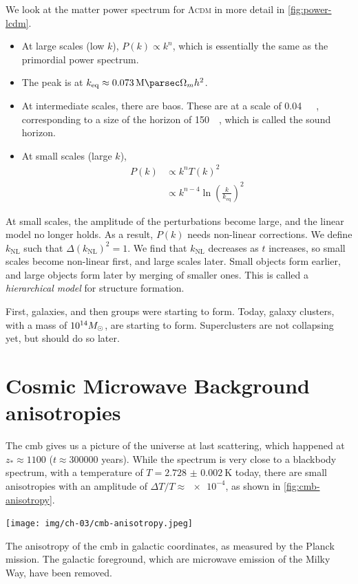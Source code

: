 We look at the matter power spectrum for \textsc{Λcdm} in more detail in \cref{fig:power-lcdm}. 
\begin{itemize}
	\item At large scales (low $k$), $P(k) \propto k^n$, which is essentially the same as the primordial power spectrum.
	\item The peak is at $k_\text{eq} \approx \SI{0.073}{\per\mega\parsec} \Omega_m h^2$.
	\item At intermediate scales, there are \acp{bao}. These are at a scale of \SI{0.04}{\per\mega\parsec}, corresponding to a size of the horizon of \SI{150}{\mega\parsec}, which is called the sound horizon.
	\item At small scales (large $k$),
	\begin{align*}
		P(k)
		&\propto k^n T(k)^2\\
		&\propto k^{n-4} \ln
		\left( \frac{k}{k_\text{eq}} \right)^2
	\end{align*}
\end{itemize}
At small scales, the amplitude of the perturbations become large, and the linear model no longer holds. As a result, $P(k)$ needs non-linear corrections. We define $k_\text{NL}$ such that $\Delta(k_\text{NL})^2 = 1$. We find that $k_\text{NL}$ decreases as $t$ increases, so small scales become non-linear first, and large scales later. Small objects form earlier, and large objects form later by merging of smaller ones. This is called a \emph{hierarchical model} for structure formation.
 
First, galaxies, and then groups were starting to form.
Today, galaxy clusters, with a mass of $\num{e14} M_\odot$, are starting to form.
Superclusters are not collapsing yet, but should do so later.






\section{Cosmic Microwave Background anisotropies}
The \ac{cmb} gives us a picture of the universe at last scattering, which happened at $z_* \approx \num{1100}$ ($t \approx \num{300000}$ years). While the spectrum is very close to a blackbody spectrum, with a temperature of $T = \SI{2.728(2)}{\kelvin}$ today, there are small anisotropies with an amplitude of $\Delta T / T \approx \num{e-4}$, as shown in \cref{fig:cmb-anisotropy}.

\begin{marginfigure}
	\centering
	\texttt{[image: img/ch-03/cmb-anisotropy.jpeg]}
	\caption{The anisotropy of the \ac{cmb} in galactic coordinates, as measured by the Planck mission. The galactic foreground, which are microwave emission of the Milky Way, have been removed.}
	\label{fig:cmb-anisotropy}
\end{marginfigure}

